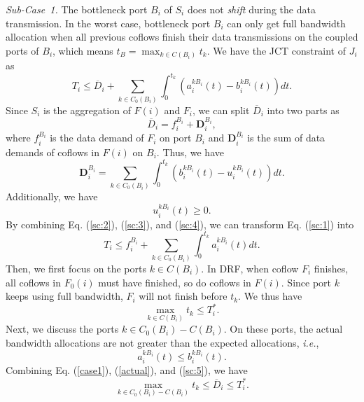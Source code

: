 \documentclass[10pt, conference, letterpaper]{IEEEtran}
\begin{document}
\begin{IEEEproof}
\emph{Sub-Case~1.} The bottleneck port $B_i$ of $S_i$ does not \emph{shift} during the data transmission. In the worst case, bottleneck port $B_i$ can only get full bandwidth allocation when all previous coflows finish their data transmissions on the coupled ports of $B_i$, which means $t_B = \max_{k\in C(B_i)}t_k$. We have the JCT constraint of $J_i$ as
\begin{equation}\label{sc:1}
	T_i \leq \overline{D}_i + \sum_{k\in C_0(B_i)}\int_0^{t_k}(a_i^{kB_i}(t)-b_i^{kB_i}(t))dt.
\end{equation}
Since $S_i$ is the aggregation of $F(i)$ and $F_i$, we can split $\overline{D}_i$ into two parts as
\begin{equation}\label{sc:2}
	\overline{D}_i = f_i^{B_i} + \mathbf{D}_i^{B_i},
\end{equation}
where $f_i^{B_i}$ is the data demand of $F_i$ on port $B_i$ and $\mathbf{D}_i^{B_i}$ is the sum of data demands of coflows in $F(i)$ on $B_i$. Thus, we have
\begin{equation}\label{sc:3}
	\mathbf{D}_i^{B_i} = \sum_{k\in C_0(B_i)}\int_0^{t_k}(b_i^{kB_i}(t)-u_i^{kB_i}(t))dt.
\end{equation}
Additionally, we have
\begin{equation}\label{sc:4}
	u_i^{kB_i}(t) \geq 0.
\end{equation}
By combining Eq. (\ref{sc:2}), (\ref{sc:3}), and (\ref{sc:4}), we can transform Eq. (\ref{sc:1}) into
\begin{equation}\label{sc:1-0}
	T_i \leq f_i^{B_i} + \sum_{k\in C_0(B_i)}\int_0^{t_k}a_i^{kB_i}(t)dt.
\end{equation}
Then, we first focus on the ports $k$$\in$$C(B_i)$. In DRF, when coflow $F_i$ finishes, all coflows in $F_0(i)$ must have finished, so do coflows in $F(i)$. Since port $k$ keeps using full bandwidth, $F_i$ will not finish before $t_k$. We thus have
\begin{equation}\label{sc:1-1}
	\max_{k\in C(B_i)}t_k \leq T_i^*.
\end{equation}
Next, we discuss the ports $k$$\in$$C_0(B_i)-C(B_i)$. On these ports, the actual bandwidth allocations are not greater than the expected allocations, \emph{i.e.},
\begin{equation}\label{sc:5}
	a_i^{kB_i}(t)\leq b_i^{kB_i}(t).
\end{equation}
Combining Eq. (\ref{case1}), (\ref{actual}), and (\ref{sc:5}), we have
\begin{equation}\label{sc:1-2}
	\max_{k \in C_0(B_i)-C(B_i)} t_k \leq \overline{D}_i \leq T_i^*.

\end{equation}
\end{IEEEproof}
\end{document}
